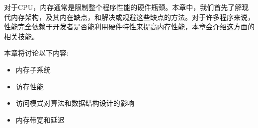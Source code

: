 对于CPU，内存通常是限制整个程序性能的硬件瓶颈。本章中，我们首先了解现代内存架构，及其内在缺点，和解决或规避这些缺点的方法。对于许多程序来说，性能完全依赖于开发者是否能利用硬件特性来提高内存性能，本章会介绍这方面的相关技能。

本章将讨论以下内容:

\begin{itemize}
\item 内存子系统
\item 访存性能
\item 访问模式对算法和数据结构设计的影响
\item 内存带宽和延迟
\end{itemize}
























